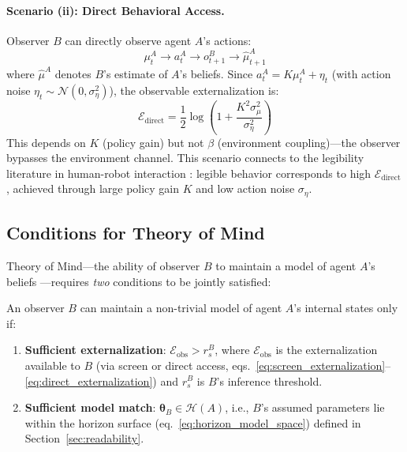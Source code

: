 \documentclass[runningheads]{llncs}
\begin{document}
\paragraph{Scenario (ii): Direct Behavioral Access.}
Observer $B$ can directly observe agent $A$'s actions:
\begin{equation}
    \mu_t^A \to a_t^A \to o_{t+1}^B \to \hat{\mu}_{t+1}^A
    \label{eq:direct}
\end{equation}
where $\hat{\mu}^A$ denotes $B$'s estimate of $A$'s beliefs. Since $a_t^A = K \mu_t^A + \eta_t$ (with action noise $\eta_t \sim \mathcal{N}(0, \sigma_\eta^2)$), the observable externalization is:
\begin{equation}
    \mathcal{E}_{\text{direct}} = \frac{1}{2} \log \left( 1 + \frac{K^2 \sigma_\mu^2}{\sigma_\eta^2} \right)
    \label{eq:direct_externalization}
\end{equation}
This depends on $K$ (policy gain) but not $\beta$ (environment coupling)---the observer bypasses the environment channel. This scenario connects to the legibility literature in human-robot interaction \cite{dragan2013legibility,maisto2023interactive}: legible behavior corresponds to high $\mathcal{E}_{\text{direct}}$, achieved through large policy gain $K$ and low action noise $\sigma_\eta$.

\subsection{Conditions for Theory of Mind}

Theory of Mind---the ability of observer $B$ to maintain a model of agent $A$'s beliefs \cite{friston2015duet}---requires \emph{two} conditions to be jointly satisfied:

\begin{proposition}
\label{prop:dual_tom}
An observer $B$ can maintain a non-trivial model of agent $A$'s internal states only if:
\begin{enumerate}
    \item \textbf{Sufficient externalization}: $\mathcal{E}_{\text{obs}} > r_s^B$, where $\mathcal{E}_{\text{obs}}$ is the externalization available to $B$ (via screen or direct access, eqs.~\ref{eq:screen_externalization}--\ref{eq:direct_externalization}) and $r_s^B$ is $B$'s inference threshold.
    \item \textbf{Sufficient model match}: $\boldsymbol{\theta}_B \in \mathcal{H}(A)$, i.e., $B$'s assumed parameters lie within the horizon surface (eq.~\ref{eq:horizon_model_space}) defined in Section~\ref{sec:readability}.
\end{enumerate}
\end{proposition}
\end{document}
